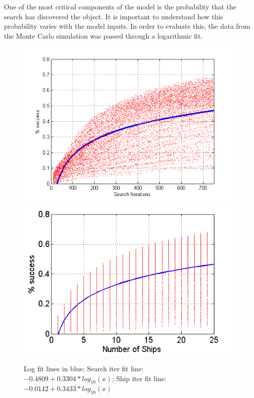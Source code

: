\documentclass[a4paper]{article}
\begin{document}
One of the most critical components of the model is the probability that the search has discovered the object. It is important to understand how this probability varies with the model inputs. In order to evaluate this, the data from the Monte Carlo simulation was passed through a logarithmic fit.

\begin{figure}[H]\begin{center}
\includegraphics[scale=0.5]{../Matlab/Images/LogSearchIterPctSuccessMSE0.png}
\includegraphics[scale=0.5]{../Matlab/Images/LogShipCtPctSuccessMSE0.png}
\caption{Log fit lines in blue; Search iter fit line: $-0.4809+0.3304*log_{10}(x)$; Ship iter fit line: $-0.0142+0.3433*log_{10}(x)$}
\end{center}\end{figure}
\end{document}
